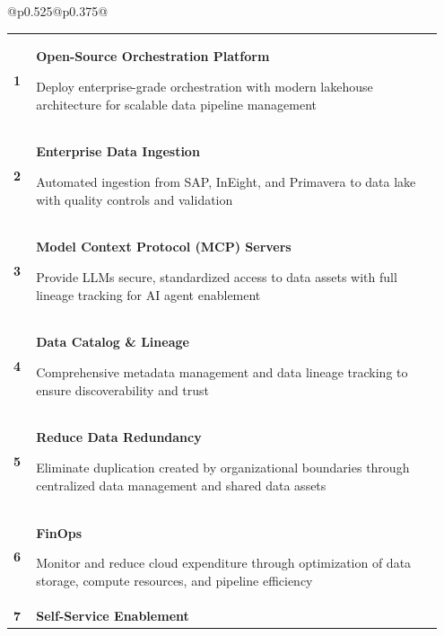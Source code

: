 \documentclass[12pt, a4paper]{article}
\begin{document}
     {\footnotesize
     }

     \vspace{-0.5em}

     {\scriptsize
     \begin{tabular}{@{}p{0.525\textwidth}@{\hspace{0.05\textwidth}}p{0.375\textwidth}@{}}
     \begin{minipage}[t]{\linewidth}
         \renewcommand{\arraystretch}{0.95}
         \begin{tabular}{@{}p{0.05\linewidth}p{0.90\linewidth}@{}}
         \textbf{1} & \textbf{Open-Source Orchestration Platform}
         
         {\scriptsize Deploy enterprise-grade orchestration with modern lakehouse architecture for scalable data pipeline management} \\[0.15em]
         \textbf{2} & \textbf{Enterprise Data Ingestion}
         
         {\scriptsize Automated ingestion from SAP, InEight, and Primavera to data lake with quality controls and validation} \\[0.15em]
         \textbf{3} & \textbf{Model Context Protocol (MCP) Servers}
         
         {\scriptsize Provide LLMs secure, standardized access to data assets with full lineage tracking for AI agent enablement} \\[0.15em]
         \textbf{4} & \textbf{Data Catalog \& Lineage}
         
         {\scriptsize Comprehensive metadata management and data lineage tracking to ensure discoverability and trust} \\[0.15em]
         \textbf{5} & \textbf{Reduce Data Redundancy}
         
         {\scriptsize Eliminate duplication created by organizational boundaries through centralized data management and shared data assets} \\[0.15em]
         \textbf{6} & \textbf{FinOps}
         
         {\scriptsize Monitor and reduce cloud expenditure through optimization of data storage, compute resources, and pipeline efficiency} \\[0.15em]
         \textbf{7} & \textbf{Self-Service Enablement}
         

\end{tabular}
\end{minipage}
\end{tabular}}
\end{document}
